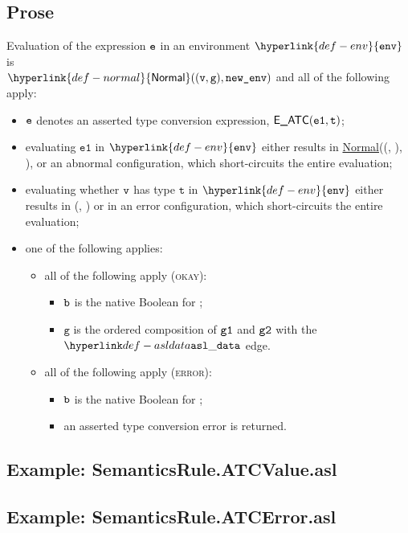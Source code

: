 \documentclass{book}
\newcommand\ProseOrAbnormal[0]{or an abnormal configuration, which short-circuits the entire evaluation}
\newcommand\Normal[0]{\hyperlink{def-normal}{\textsf{Normal}}}
\newcommand\env[0]{\hyperlink{def-env}{\texttt{env}}}
\newcommand\vg[0]{\texttt{g}}
\newcommand\vt[0]{\texttt{t}}
\newcommand\veone[0]{\texttt{e1}}
\begin{document}
  \subsection{Prose}
  Evaluation of the expression $\texttt{e}$ in an environment $\env$ is \\
  $\Normal((\vv, \vg), \newenv)$ and all of the following apply:
  \begin{itemize}
  \item $\texttt{e}$ denotes an asserted type conversion expression, $\EATC(\veone, \vt)$;
  \item evaluating $\veone$ in $\env$ either results in \Normal((\vv, \vgone), \newenv),
  \ProseOrAbnormal;
  \item evaluating whether $\texttt{v}$ has type $\vt$ in $\env$ either results in (\vb, \vgtwo)
  or in an error configuration, which short-circuits the entire evaluation;
  \item one of the following applies:
        \begin{itemize}
        \item all of the following apply (\textsc{okay}):
              \begin{itemize}
              \item $\texttt{b}$ is the native Boolean for \True;
              \item $\vg$ is the ordered composition of $\texttt{g1}$ and $\texttt{g2}$ with the $\asldata$ edge.
              \end{itemize}
        \item all of the following apply (\textsc{error}):
              \begin{itemize}
              \item $\texttt{b}$ is the native Boolean for \True;
              \item an asserted type conversion error is returned.
              \end{itemize}
        \end{itemize}
  \end{itemize}

  \subsection{Example: SemanticsRule.ATCValue.asl}

  \subsection{Example: SemanticsRule.ATCError.asl}
\end{document}
